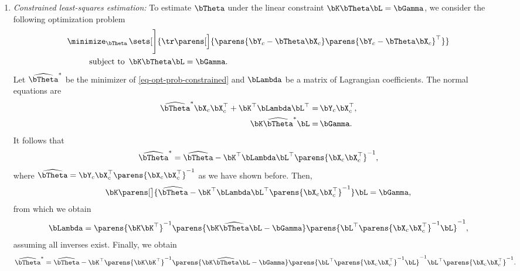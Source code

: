 \documentclass[12pt]{article}
\begin{document}
\begin{enumerate}[label=\textbf{\arabic*.}]
\begin{enumerate}
		\item \textit{Constrained least-squares estimation:} To estimate $\bTheta$ under the linear constraint $\bK \bTheta \bL = \bGamma$, we consider the following optimization problem 
		\begin{equation}\label{eq-opt-prob-constrained}
			\begin{aligned}
				\minimize_{\bTheta} & \, \sets[\Bigg]{ \tr \parens[\Big]{\parens{\bY_c - \bTheta \bX_c} \parens{\bY_c - \bTheta \bX_c}^\top} } \\ 
				\text{subject to } & \, \bK \bTheta \bL = \bGamma. 
			\end{aligned}
		\end{equation}
		Let $\widehat{\bTheta}^*$ be the minimizer of \eqref{eq-opt-prob-constrained} and $\bLambda$ be a matrix of Lagrangian coefficients. The normal equations are 
		\begin{equation}
			\begin{aligned}
				\widehat{\bTheta}^* \bX_c \bX_c^\top + \bK^{\top} \bLambda \bL^\top = & \, \bY_c \bX_c^\top, \\ 
				\bK \widehat{\bTheta}^* \bL = & \, \bGamma. 
			\end{aligned}
		\end{equation}
		It follows that 
		\begin{align*}
			\widehat{\bTheta}^* = \widehat{\bTheta} - \bK^{\top} \bLambda \bL^\top \parens{\bX_c \bX_c^\top}^{-1}, 
		\end{align*}
		where $\widehat{\bTheta} = \bY_c \bX_c^\top \parens{\bX_c \bX_c^{\top}}^{-1}$ as we have shown before. Then, 
		\begin{align*}
			\bK \parens[\big]{\widehat{\bTheta} - \bK^{\top} \bLambda \bL^\top \parens{\bX_c \bX_c^\top}^{-1}} \bL = \bGamma, 
		\end{align*} 
		from which we obtain 
		\begin{align*}
			\bLambda = \parens{\bK \bK^\top}^{-1} \parens{\bK \widehat{\bTheta}\bL - \bGamma} \parens{\bL^\top \parens{\bX_c \bX_c^\top }^{-1} \bL}^{-1}, 
		\end{align*}
		assuming all inverses exist. Finally, we obtain 
		\begin{align*}
			\widehat{\bTheta}^* = \widehat{\bTheta} - \bK^{\top}\parens{\bK \bK^\top}^{-1} \parens{\bK \widehat{\bTheta}\bL - \bGamma} \parens{\bL^\top \parens{\bX_c \bX_c^\top }^{-1} \bL}^{-1} \bL^\top \parens{\bX_c \bX_c^\top}^{-1}. 
		\end{align*}
		

\end{enumerate}
\end{enumerate}
\end{document}
